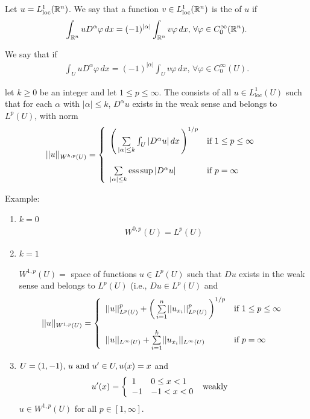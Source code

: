 \documentclass[12pt,a4paper]{report}
\begin{document}
\begin{definition} Let $u = L^1_{\text{loc}}(\mathbb{R}^n)$.  We say that a function $v \in L^1_{\text{loc}}(\mathbb{R}^n)$ is the  of $u$ if 
\begin{align*}
	 \int_{\mathbb{R}^n} u D^\alpha \varphi \,dx = (-1)^{|\alpha|} \int_{\mathbb{R}^n} v\varphi \, dx,\, \forall \varphi\in C^\infty_0(\mathbb{R}^n).
\end{align*}
\end{definition}

\begin{definition}We say that  if
\begin{align*}
	\int_{U} u D^\alpha \varphi \,dx = (-1)^{|\alpha|} \int_{U} v\varphi \, dx,\, \forall \varphi\in C^\infty_0(U).
\end{align*}
\end{definition}

\newcommand{\SSPACE}[3]{{W^{#1,#2}(#3)}}
\begin{definition}
let $k \ge 0$ be an integer and let $1\le p \le \infty$.  The \DEFINE{Sobolev space $\SSPACE{k}{p}{U}$} consists of all $u \in L^1_{\text{loc}}(U)$ such that for each $\alpha$ with $|\alpha|\le k$, $D^\alpha u$ exists in the weak sense and belongs to $L^p(U)$, with norm
\begin{align*}
	||u||_{\SSPACE{k}{p}{U}} &= \BINDEF{\PAREN{\SUM{|\alpha|\le k} {}\int_U |D^\alpha u|\, dx }^{1/p} & \text{if } 1\le p\le \infty \\ }{\SUM{|\alpha|\le k}{} \operatorname{ess}\sup|D^\alpha u| & \text{if }p = \infty}
\end{align*}
\end{definition}

Example: \begin{enumerate}
	\item $k=0$
	\begin{align*}
		\SSPACE{0}{p}{U} = L^p(U)
	\end{align*}
	\item $k=1$
	
	$\SSPACE{1}{p}{U} =$ space of functions $u\in L^p(U)$ such that $Du$ exists in the weak sense and belongs to $L^p(U)$ (i.e., $Du \in L^p(U)$ and
	\begin{align*}
		||u||_{\SSPACE{1}{p}{U}} = \BINDEF{||u||^p_{L^p(U)} + \PAREN{\SUM{i=1}{n} ||u_{x_i}||^p_{L^p(U)}}^{1/p} & \text{if } 1\le p\le \infty \\}{||u||_{L^\infty(U)} + \SUM{i=1}{k} ||u_{x_i}||_{L^\infty(U)} & \text{if }p = \infty}
	\end{align*}
	
	\item $U=(1,-1),\, u \text{ and } u' \in U, u(x) = x$ and
	\begin{align*}
		u'(x) &= \left \{ \begin{array}{ll} 1 & 0\le x < 1\\ -1 & -1<x<0 \end{array} \right .\text{  weakly}
	\end{align*}$u \in \SSPACE{1}{p}{U}$ for all $p \in [1,\infty]$.
\end{enumerate}
\end{document}
